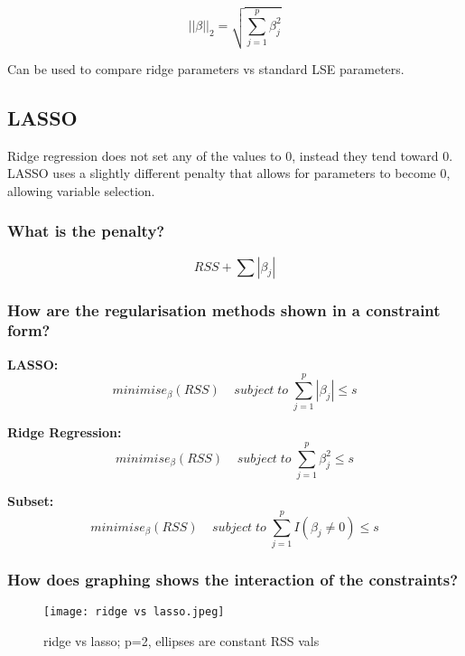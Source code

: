 \documentclass[11pt]{scrartcl} %
\begin{document}
\begin{equation}
	||\beta||_2=\sqrt{\sum^p_{j=1}{\beta_j^2}}
\end{equation}

Can be used to compare ridge parameters vs standard LSE parameters.

\subsection{LASSO}

Ridge regression does not set any of the values to 0, instead they tend toward 0. LASSO uses
a slightly different penalty that allows for parameters to become 0, allowing variable selection.

\subsubsection{What is the penalty?}

\begin{equation}
	RSS + \sum{|\beta_j|}
\end{equation}

\subsubsection{How are the regularisation methods shown in a constraint form?}

\textbf{LASSO:}
\begin{equation}
	minimise_{\beta}(RSS)\;\;\;\; subject\; to\; \sum^p_{j=1}{|\beta_j|} \leq s
\end{equation}

\textbf{Ridge Regression:}
\begin{equation}
	minimise_{\beta}(RSS)\;\;\;\; subject\; to\; \sum^p_{j=1}{\beta_j^2} \leq s
\end{equation}

\textbf{Subset:}
\begin{equation}
	minimise_{\beta}(RSS)\;\;\;\; subject\; to\; \sum^p_{j=1}{I(\beta_j\neq 0)} \leq s
\end{equation}

\subsubsection{How does graphing shows the interaction of the constraints?}

\begin{figure}[h] %
	\centering
	\texttt{[image: ridge vs lasso.jpeg]} %
	\caption{ridge vs lasso; p=2, ellipses are constant RSS vals}
\end{figure}
\end{document}
